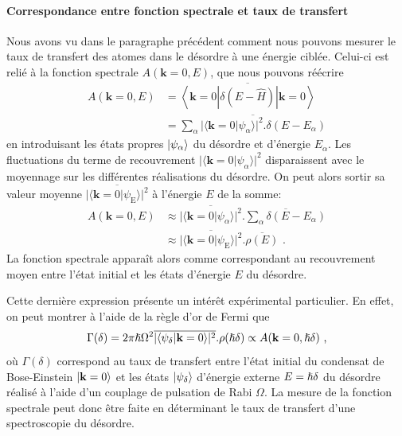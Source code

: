 \paragraph*{Correspondance entre fonction spectrale et taux de transfert}
Nous avons vu dans le paragraphe précédent comment nous pouvons mesurer le taux de transfert des atomes dans le désordre à une énergie ciblée. Celui-ci est relié à la fonction spectrale $A(\mathbf{k}=0,E)$, que nous pouvons réécrire
\begin{align}
A(\mathbf{k}=0,E)&=\overline{\left\langle \mathbf{k}=0 \left| \delta(E-\hat{H}) \right| \mathbf{k}=0 \right\rangle} \\
&= \overline{\sum_{\alpha}{|\langle\mathbf{k}=0 | \psi_{\alpha}\rangle|^2.\delta(E-E_{\alpha})}}
\end{align}
en introduisant les états propres $\left| \psi_{\alpha} \right\rangle$ du désordre et d'énergie $E_{\alpha}$. Les fluctuations du terme de recouvrement $|\langle \mathbf{k}=0 | \psi_{\alpha} \rangle|^2$ disparaissent avec le moyennage sur les différentes réalisations du désordre. On peut alors sortir sa valeur moyenne $\overline{|\langle \mathbf{k}=0 | \psi_{\mathrm{E}} \rangle|^2}$ à l'énergie $E$ de la somme:
\begin{align}
A(\mathbf{k}=0,E)&\approx \overline{|\langle \mathbf{k}=0 | \psi_{\alpha} \rangle|^2}. \overline{\sum_{\alpha}{\delta(E-E_{\alpha})}} \\
&\approx \overline{|\langle \mathbf{k}=0 | \psi_{\mathrm{E}} \rangle|^2} . \overline{\rho(E)} \text{ .}
\end{align}
La fonction spectrale apparaît alors comme correspondant au recouvrement moyen entre l'état initial et les états d'énergie $E$ du désordre.

Cette dernière expression présente un intérêt expérimental particulier. En effet, on peut montrer à l'aide de la règle d'or de Fermi que
\begin{equation}
\Gamma(\delta)=2 \pi \hslash \Omega^2 \overline{|\langle \psi_{\delta} | \mathbf{k}=0 \rangle|^2} . \rho(\hslash\delta) \propto A(\mathbf{k}=0 ,\hslash \delta) \text{ ,}
\end{equation}
où $\Gamma(\delta)$ correspond au taux de transfert entre l'état initial du condensat de Bose-Einstein $\left| \mathbf{k}=0 \right\rangle$ et les états $\left| \psi_{\delta} \right\rangle$ d'énergie externe $E=\hslash\delta$ du désordre réalisé à l'aide d'un couplage de pulsation de Rabi $\Omega$. La mesure de la fonction spectrale peut donc être faite en déterminant le taux de transfert d'une spectroscopie du désordre.

